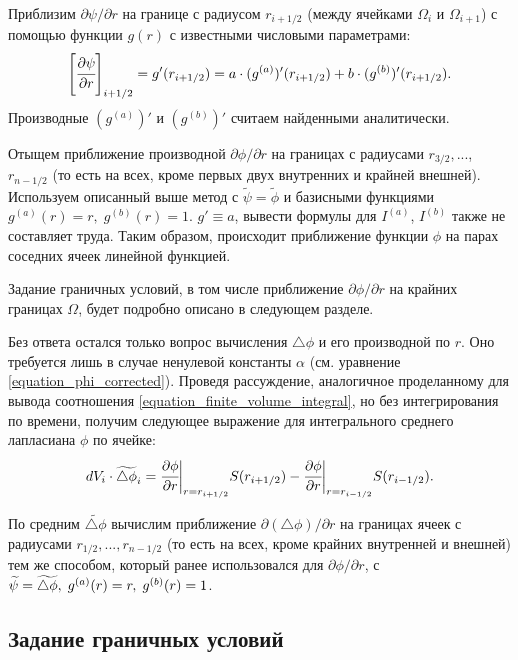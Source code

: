 \documentclass[a4paper,12pt]{article}
\newcommand*{\hm}[1]{#1\nobreak\discretionary{}
{\hbox{$\mathsurround=0pt #1$}}{}}
\theoremstyle{plain}
\theoremstyle{definition}
\begin{document}
Приблизим $\partial \psi / \partial r$ на границе с радиусом $r_{i + 1/2}$ (между ячейками $\Omega_i$ и $\Omega_{i + 1}$) с помощью функции $g(r)$ с известными числовыми параметрами:
$$\left[ \cfrac{\partial \psi}{\partial r} \right]_{i + 1/2} = g'(r_{i + 1/2}) = a \cdot (g^{(a)})'(r_{i + 1/2}) + b \cdot (g^{(b)})'(r_{i + 1/2}) \text{.}$$
Производные $(g^{(a)})'$ и $(g^{(b)})'$ считаем найденными аналитически.

Отыщем приближение производной $\partial \phi / \partial r$ на границах с радиусами $r_{3/2}, ...$, $r_{n - 1/2}$ (то есть на всех, кроме первых двух внутренних и крайней внешней). Используем описанный выше метод с $\widetilde{\psi} = \widetilde{\phi}$ и базисными функциями $g^{(a)}(r) = r, \; g^{(b)}(r) = 1$. $g' \equiv a$, вывести формулы для $I^{(a)}$, $I^{(b)}$ также не составляет труда. Таким образом, происходит приближение функции $\phi$ на парах соседних ячеек линейной функцией.

Задание граничных условий, в том числе приближение $\partial \phi / \partial r$ на крайних границах $\Omega$, будет подробно описано в следующем разделе.

Без ответа остался только вопрос вычисления $\triangle \phi$ и его производной по $r$. Оно требуется лишь в случае ненулевой константы $\alpha$ (см. уравнение \eqref{equation_phi_corrected}). Проведя рассуждение, аналогичное проделанному для вывода соотношения \eqref{equation_finite_volume_integral}, но без интегрирования по времени, получим следующее выражение для интегрального среднего лапласиана $\phi$ по ячейке:
\begin{equation}
    dV_i \cdot \widetilde{\triangle \phi}_i = \cfrac{\partial \phi}{\partial r} \bigg|_{r = r_{i + 1/2}} S(r_{i + 1/2}) - \cfrac{\partial \phi}{\partial r} \bigg|_{r = r_{i - 1/2}} S(r_{i - 1/2}) \text{.}
    \label{equation_finite_volume_laplasian}
\end{equation}

По средним $\widetilde{\triangle \phi}$ вычислим приближение $\partial (\triangle \phi) / \partial r$ на границах ячеек с радиусами $r_{1/2}, ..., r_{n - 1/2}$ (то есть на всех, кроме крайних внутренней и внешней) тем же способом, который ранее использовался для $\partial \phi / \partial r$, с $\widetilde{\psi} = \widetilde{\triangle \phi}, \; g^{(a)}(r) \hm = r, \; g^{(b)}(r) = 1$.


\subsection{Задание граничных условий}
\end{document}

